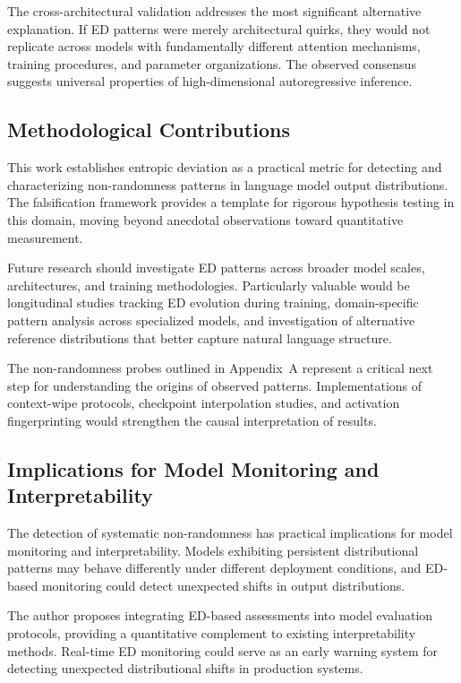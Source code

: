 \documentclass[12pt]{article}
\begin{document}
The cross-architectural validation addresses the most significant alternative explanation. If ED patterns were merely architectural quirks, they would not replicate across models with fundamentally different attention mechanisms, training procedures, and parameter organizations. The observed consensus suggests universal properties of high-dimensional autoregressive inference.

\subsection{Methodological Contributions}

This work establishes entropic deviation as a practical metric for detecting and characterizing non-randomness patterns in language model output distributions. The falsification framework provides a template for rigorous hypothesis testing in this domain, moving beyond anecdotal observations toward quantitative measurement.

Future research should investigate ED patterns across broader model scales, architectures, and training methodologies. Particularly valuable would be longitudinal studies tracking ED evolution during training, domain-specific pattern analysis across specialized models, and investigation of alternative reference distributions that better capture natural language structure.

The non-randomness probes outlined in Appendix~A represent a critical next step for understanding the origins of observed patterns. Implementations of context-wipe protocols, checkpoint interpolation studies, and activation fingerprinting would strengthen the causal interpretation of results.

\subsection{Implications for Model Monitoring and Interpretability}

The detection of systematic non-randomness has practical implications for model monitoring and interpretability. Models exhibiting persistent distributional patterns may behave differently under different deployment conditions, and ED-based monitoring could detect unexpected shifts in output distributions.

The author proposes integrating ED-based assessments into model evaluation protocols, providing a quantitative complement to existing interpretability methods. Real-time ED monitoring could serve as an early warning system for detecting unexpected distributional shifts in production systems.
\end{document}
